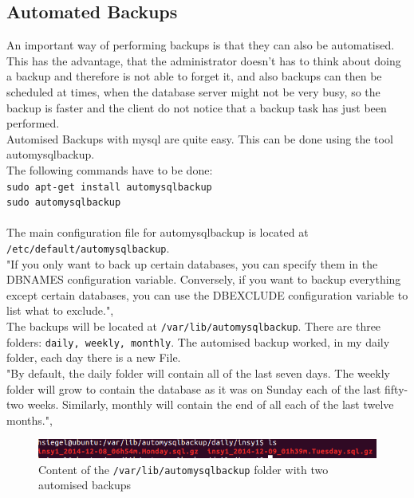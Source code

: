 \documentclass[10pt]{article}
\begin{document}
\subsection{Automated Backups}
An important way of performing backups is that they can also be automatised. This has the advantage, that the administrator doesn't has to think about doing a backup and therefore is not able to forget it, and also backups can then be scheduled at times, when the database server might not be very busy, so the backup is faster and the client do not notice that a backup task has just been performed.  \\
Automised Backups with mysql are quite easy. This can be done using the tool automysqlbackup. \\
The following commands have to be done: \\
\texttt{sudo apt-get install automysqlbackup} \\
\texttt{sudo automysqlbackup} \\ \\
The main configuration file for automysqlbackup is located at \texttt{/etc/default/automysqlbackup}. \\
"If you only want to back up certain databases, you can specify them in the DBNAMES configuration variable. Conversely, if you want to backup everything except certain databases, you can use the DBEXCLUDE configuration variable to list what to exclude.",\cite{sceduleddbbck} \\
The backups will be located at \texttt{/var/lib/automysqlbackup}. There are three folders: \texttt{daily, weekly, monthly}.
The automised backup worked, in my daily folder, each day there is a new File.\\
"By default, the daily folder will contain all of the last seven days. The weekly folder will grow to contain the database as it was on Sunday each of the last fifty-two weeks. Similarly, monthly will contain the end of all each of the last twelve months.",\cite{sceduleddbbck}
\begin{figure}[!h]
	\begin{center}
		\includegraphics[width=1.0\linewidth]{pictures/mysql_autobackup}
		\caption{Content of the \texttt{/var/lib/automysqlbackup} folder with two automised backups}
		\label{content}
	\end{center}
\end{figure}
\FloatBarrier
\end{document}
